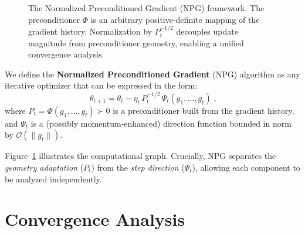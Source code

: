 \documentclass[11pt,twoside,openright]{book}
\begin{document}
\begin{figure}[tb]
  \centering
  \caption{The Normalized Preconditioned Gradient (NPG) framework. The preconditioner
    $\Phi$ is an arbitrary positive-definite mapping of the gradient history. Normalization
    by $P_t^{-1/2}$ decouples update magnitude from preconditioner geometry, enabling
    a unified convergence analysis.}
  \label{fig:npg}
\end{figure}

We define the \textbf{Normalized Preconditioned Gradient} (NPG) algorithm as any iterative
optimizer that can be expressed in the form:
\begin{equation}
  \boxed{\;\theta_{t+1} = \theta_t - \eta_t\, P_t^{-1/2}\,\Psi_t(g_1,\dots,g_t)\;},
  \label{eq:npg}
\end{equation}
where $P_t = \Phi(g_1,\dots,g_t) \succ 0$ is a preconditioner built from the gradient history,
and $\Psi_t$ is a (possibly momentum-enhanced) direction function bounded in norm by
$\mathcal{O}(\|g_t\|)$.

Figure~\ref{fig:npg} illustrates the computational graph. Crucially, NPG separates the
\emph{geometry adaptation} ($P_t$) from the \emph{step direction} ($\Psi_t$), allowing each
component to be analyzed independently.

\section{Convergence Analysis}
\end{document}
